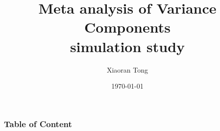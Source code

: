 \documentclass{beamer}
\title[Kernel Genomics]{Meta analysis of Variance Components \\
  simulation study}
\author{Xiaoran Tong} %
\institute[EPI Biosta,
MSU] %
{ Michigan State University \\ %
  \medskip \textit{tongxia1@msu.edu} \\%
  \textit{qlu@epi.msu.edu} %
} \date{\today} %
\begin{document}
\begin{frame}
  \titlepage %
\end{frame}

\begin{frame}
  \frametitle{Table of
    Content} %
  \tableofcontents %
\end{frame}

\end{document}
